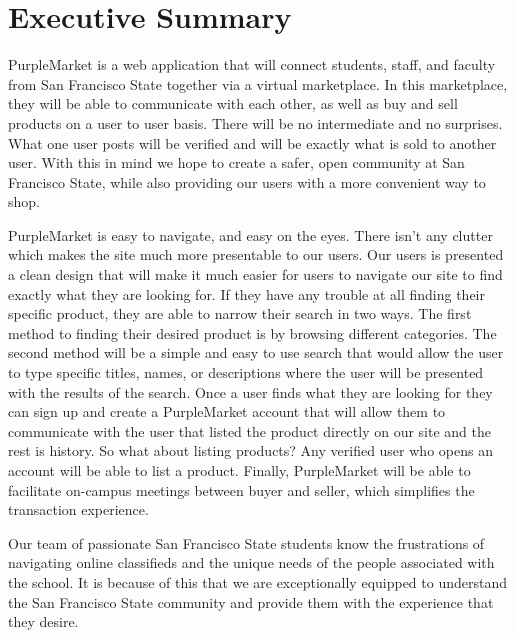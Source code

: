 \section{Executive Summary}

PurpleMarket is a web application that will connect students, staff, and faculty from San Francisco State together via a virtual marketplace. In this marketplace, they will be able to communicate with each other, as well as buy and sell products on a user to user basis. There will be no intermediate and no surprises. What one user posts will be verified and will be exactly what is sold to another user. With this in mind we hope to create a safer, open community at San Francisco State, while also providing our users with a more convenient way to shop.

PurpleMarket is easy to navigate, and easy on the eyes. There isn’t any clutter which makes the site much more presentable to our users. Our users is presented a clean design that will make it much easier for users to navigate our site to find exactly what they are looking for. If they have any trouble at all finding their specific product, they are able to narrow their search in two ways. The first method to finding their desired product is by browsing different categories. The second method will be a simple and easy to use search that would allow the user to type specific titles, names, or descriptions where the user will be presented with the results of the search. Once a user finds what they are looking for they can sign up and create a PurpleMarket account that will allow them to communicate with the user that listed the product directly on our site and the rest is history. So what about listing products?  Any verified user who opens an account will be able to list a product. Finally, PurpleMarket will be able to facilitate on-campus meetings between buyer and seller, which simplifies the transaction experience.

Our team of passionate San Francisco State students know the frustrations of navigating online classifieds and the unique needs of the people associated with the school.  It is because of this that we are exceptionally equipped to understand the San Francisco State community and provide them with the experience that they desire.